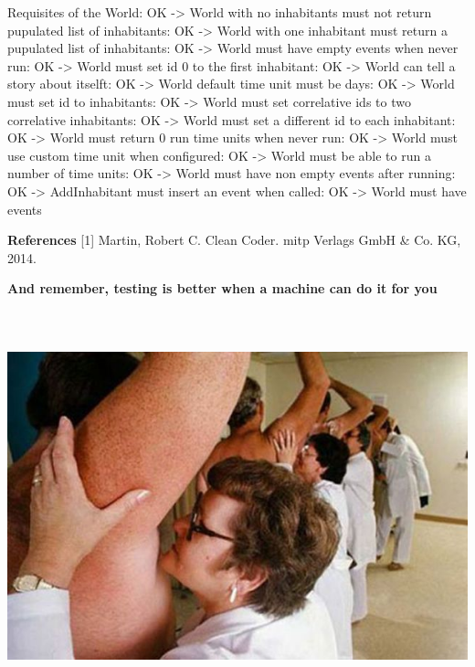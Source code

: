 \documentclass[a4paper]{article}
\newcommand\textstyleStrongEmphasis[1]{\textbf{#1}}
\begin{document}
Requisites of the World: OK -{\textgreater} World with no inhabitants must not return
pupulated list of inhabitants: OK -{\textgreater} World with one inhabitant must return a pupulated
list of inhabitants: OK -{\textgreater} World must have empty events when never
run: OK -{\textgreater} World must set id 0 to the first
inhabitant: OK -{\textgreater} World can tell a story about itselft: OK -{\textgreater} World default time unit must be days: OK -{\textgreater} World must set id to inhabitants: OK -{\textgreater} World must set correlative ids to two correlative
inhabitants: OK -{\textgreater} World must set a different id to each
inhabitant: OK -{\textgreater} World must return 0 run time units when never
run: OK -{\textgreater} World must use custom time unit when
configured: OK -{\textgreater} World must be able to run a number of time
units: OK -{\textgreater} World must have non empty events after
running: OK -{\textgreater} AddInhabitant must insert an event when
called: OK -{\textgreater} World must have events

\textstyleStrongEmphasis{References\newline
}[1] Martin, Robert C. Clean Coder. mitp Verlags GmbH \& Co. KG, 2014.

\textstyleStrongEmphasis{And remember, testing is better when a machine
can do it for you}


\includegraphics[width=16.933cm,height=11.324cm]{makingofmade113-img7.jpg}
\end{document}
